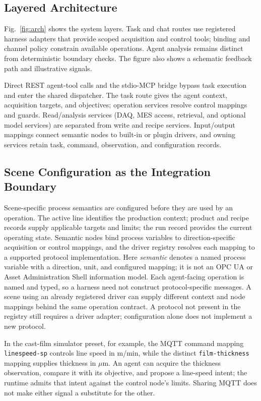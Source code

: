 \subsection{Layered Architecture}
\label{sec:layers}
Fig.~\ref{fig:arch} shows the system layers. Task and chat routes use registered harness adapters that provide scoped acquisition and control tools; binding and channel policy constrain available operations. Agent analysis remains distinct from deterministic boundary checks. The figure also shows a schematic feedback path and illustrative signals.

Direct REST agent-tool calls and the stdio-MCP bridge bypass task execution and enter the shared dispatcher. The task route gives the agent context, acquisition targets, and objectives; operation services resolve control mappings and guards. Read/analysis services (DAQ, MES access, retrieval, and optional model services) are separated from write and recipe services. Input/output mappings connect semantic nodes to built-in or plugin drivers, and owning services retain task, command, observation, and configuration records.

\subsection{Scene Configuration as the Integration Boundary}
\label{sec:scene-config}
Scene-specific process semantics are configured before
they are used by an operation. The active line identifies the production context; product
and recipe records supply applicable targets and limits; the run record
provides the current operating state. Semantic nodes bind process variables
to direction-specific acquisition or control mappings, and the driver
registry resolves each mapping to a supported protocol implementation. Here
\emph{semantic} denotes a named process variable with a direction, unit, and
configured mapping; it is not an OPC UA or Asset Administration Shell
information model. Each agent-facing operation is named and typed, so a harness need not
construct protocol-specific messages. A scene using an already registered
driver can supply different context and node mappings behind the same
operation contract. A protocol not present in the registry still requires a
driver adapter; configuration alone does not implement a new protocol.

In the cast-film simulator preset, for example, the MQTT command mapping
\texttt{linespeed-sp} controls line speed in m/min, while the distinct
\texttt{film-thickness} mapping supplies thickness in $\mu$m. An agent can
acquire the thickness observation, compare it with its objective, and propose a
line-speed intent; the runtime admits that intent against the control node's
limits. Sharing MQTT does not make either signal a substitute for the other.

